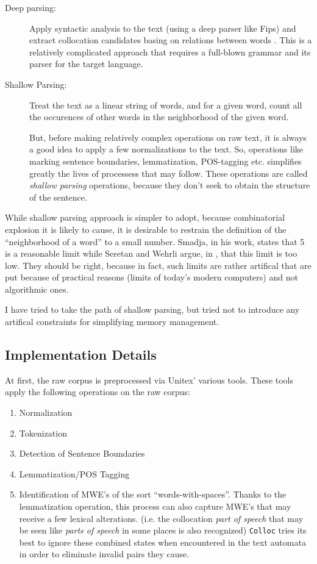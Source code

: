 \documentclass[a4paper,12pt,oneside]{article}
\begin{document}
\begin{description}
\item[Deep parsing:] Apply syntactic analysis to the text (using a deep parser like Fips\cite{fips2007}) and extract collocation candidates basing on relations between words \cite{SeretanWehrli2006ACL}. This is a relatively complicated approach that requires a full-blown grammar and its parser for the target language.

\item[Shallow Parsing:] Treat the text as a linear string of words, and for a given word, count all the occurences of other words in the neighborhood of the given word. 

But, before making relatively complex operations on raw text, it is always a good idea to apply a few normalizations to the text. So, operations like marking sentence boundaries, lemmatization, POS-tagging etc. simplifies greatly the lives of processess that may follow\cite{smadja93}. These operations are called \emph{shallow parsing} operations, because they don't seek to obtain the structure of the sentence.

\end{description}

While shallow parsing approach is simpler to adopt, because combinatorial explosion it is likely to cause, it is desirable to restrain the definition of the ``neighborhood of a word'' to a small number. Smadja, in his work\cite{smadja93}, states that 5 is a reasonable limit while Seretan and Wehrli argue, in \cite{SeretanWehrli2006ACL}, that this limit is too low. They should be right, because in fact, such limits are rather artifical that are put because of practical reasons (limits of today's modern computers) and not algorithmic ones.

I have tried to take the path of shallow parsing, but tried not to introduce any artifical constraints for simplifying memory management.

\subsection{Implementation Details}
At first, the raw corpus is preprocessed via Unitex' various tools. These tools apply the following operations on the raw corpus:
\begin{enumerate}
\item Normalization
\item Tokenization
\item Detection of Sentence Boundaries
\item Lemmatization/POS Tagging
\item Identification of MWE's of the sort ``words-with-spaces''. Thanks to the lemmatization operation, this process can also capture MWE's that may receive a few lexical alterations. (i.e. the collocation \emph{part of speech} that may be seen like \emph{parts of speech} in some places is also recognized) \texttt{Colloc} tries its best to ignore these combined states when encountered in the text automata in order to eliminate invalid pairs they cause.
\end{enumerate}
\end{document}
